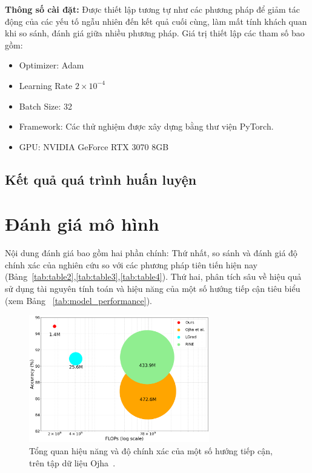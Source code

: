 \textbf{Thông số cài đặt:} Được thiết lập tương tự như các phương pháp \cite{Wang2019CNNGeneratedIA, Tan2023RethinkingTU,Tan2023LearningOG} để giảm tác động của các yếu tố ngẫu nhiên đến kết quả cuối cùng, làm mất tính khách quan khi so sánh, đánh giá giữa nhiều phương pháp. Giá trị thiết lập các tham số bao gồm:
	\begin{itemize}
		\item Optimizer: Adam
		\item Learning Rate $2 \times 10^{-4}$
		\item Batch Size: 32
		\item Framework: Các thử nghiệm được xây dựng bằng thư viện PyTorch.
		\item GPU: NVIDIA GeForce RTX 3070 8GB
	\end{itemize}

\subsection{Kết quả quá trình huấn luyện}



\section{Đánh giá mô hình}
%
Nội dung đánh giá bao gồm hai phần chính: Thứ nhất, so sánh và đánh giá độ chính xác của nghiên cứu so với các phương pháp tiên tiến hiện nay (Bảng~\ref{tab:table2},\ref{tab:table3},\ref{tab:table4}). Thứ hai, phân tích sâu về hiệu quả sử dụng tài nguyên tính toán và hiệu năng của một số hướng tiếp cận tiêu biểu (xem Bảng ~\ref{tab:model_performance}).
%
%
%
\begin{figure}[ht!]
	\centering
	\includegraphics[width=0.7\textwidth]{Images/tease.png}
	\caption{Tổng quan hiệu năng và độ chính xác của một số hướng tiếp cận, trên tập dữ liệu Ojha~\cite{Ojha2023TowardsUF}.}
	\label{fig:teaser}
\end{figure}
